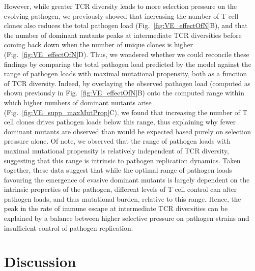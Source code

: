 However, while greater TCR diversity leads to more selection pressure on the evolving pathogen, we previously showed that increasing the number of T cell clones also reduces the total pathogen load (Fig.~\ref{fig:VE_effectOfN}B), and that the number of dominant mutants peaks at intermediate TCR diversities before coming back down when the number of unique clones is higher (Fig.~\ref{fig:VE_effectOfN}D). Thus, we wondered whether we could reconcile these findings by comparing the total pathogen load predicted by the model against the range of pathogen loads with maximal mutational propensity, both as a function of TCR diversity. Indeed, by overlaying the observed pathogen load (computed as shown previously in Fig.~\ref{fig:VE_effectOfN}B) onto the computed range within which higher numbers of dominant mutants arise (Fig.~\ref{fig:VE_supp_maxMutProp}C), we found that increasing the number of T cell clones drives pathogen loads below this range, thus explaining why fewer dominant mutants are observed than would be expected based purely on selection pressure alone. Of note, we observed that the range of pathogen loads with maximal mutational propensity is relatively independent of TCR diversity, suggesting that this range is intrinsic to pathogen replication dynamics. Taken together, these data suggest that while the optimal range of pathogen loads favouring the emergence of evasive dominant mutants is largely dependent on the intrinsic properties of the pathogen, different levels of T cell control can alter pathogen loads, and thus mutational burden, relative to this range. Hence, the peak in the rate of immune escape at intermediate TCR diversities can be explained by a balance between higher selective pressure on pathogen strains and insufficient control of pathogen replication.


\section{Discussion}

